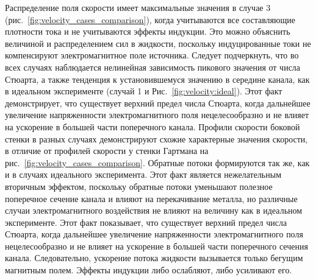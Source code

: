 Распределение поля скорости имеет максимальные значения в случае 3 (рис.~\ref{fig:velocity_cases_comparison}), когда учитываются все составляющие плотности тока и не учитываются эффекты индукции. Это можно объяснить величиной и распределением сил в жидкости, поскольку индуцированные токи не компенсируют электромагнитное поле источника. Следует подчеркнуть, что во всех случаях наблюдается нелинейная зависимость пикового значения от числа Стюарта, а также тенденция к установившемуся значению в середине канала, как в идеальном эксперименте (случай 1 и Рис.~\ref{fig:velocity:ideal}). Этот факт демонстрирует, что существует верхний предел числа Стюарта, когда дальнейшее увеличение напряженности электромагнитного поля нецелесообразно и не влияет на ускорение в большей части поперечного канала.
Профили скорости боковой стенки в разных случаях демонстрируют схожие характерные значения скорости, в отличие от профилей скорости у стенки Гартмана на рис.~\ref{fig:velocity_cases_comparison}. Обратные потоки формируются так же, как и в случаях идеального эксперимента. Этот факт является нежелательным вторичным эффектом, поскольку обратные потоки уменьшают полезное поперечное сечение канала и влияют на перекачивание металла, но различные случаи электромагнитного воздействия не влияют на величину как в идеальном эксперименте. Этот факт показывает, что существует верхний предел числа Стюарта, когда дальнейшее увеличение напряженности электромагнитного поля нецелесообразно и не влияет на ускорение в большей части поперечного сечения канала. Следовательно, ускорение потока жидкости вызывается только бегущим магнитным полем. Эффекты индукции либо ослабляют, либо усиливают его.


